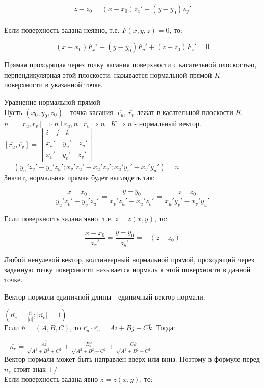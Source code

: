 $$z-z_0 = (x-x_0)z_x' + (y-y_0)z_y'$$
\\
Если поверхность задана неявно, т.е. $F(x,y,z) = 0$, то: 

$$(x-x_0)F_x' + (y-y_0)F_y' + (z-z_0)F_z' = 0$$

\opred

Прямая проходящая через точку касания поверхности с касательной плоскостью, перпендикулярная этой плоскости, называется нормальной прямой $K$ поверхности в указанной точке.

Уравнение нормальной прямой 
\\
Пусть $(x_0,y_0,z_0)$ - точка касания. $\overline{r_u}$,  $\overline{r_v}$ лежат в касательной плоскости $K$.
\\
$\overline {n} = [\overline{r_u},  \overline{r_v}] \Rightarrow \overline {n} \bot \overline{r_u}, \overline {n} \bot \overline{r_v} \Rightarrow \overline {n} \bot  K  \Rightarrow \overline {n}$ - нормальный вектор.
\\
$[\overline{r_u},  \overline{r_v}] =$
$\left| 
  \begin{array}{ccc}
i \quad j \quad k
\\
x_u' \quad y_u' \quad z_u'
\\
x_v' \quad y_v' \quad z_v'
  \end{array}
\right|$
$=(y_u'z_v' - y_v'z_u'; x_v'z_u' - x_u'z_v'; x_u'y_v' - x_v'y_u') = \overline{n} $.
\\
Значит, нормальная прямая будет выглядеть так:

$$\frac {x-x_0}{y_u'z_v' - y_v'z_u'} = \frac {y-y_0}{x_v'z_u' - x_u'z_v'} =  \frac {z-z_0}{x_u'y_v' - x_v'y_u'}$$

Если поверхность задана явно, т.е. $z = z(x,y)$, то:

$$\frac {x-x_0}{z_x'} = \frac {y-y_0}{z_y'} = -(z - z_0)$$

\opred

Любой ненулевой вектор, коллинеарный нормальной прямой, проходящий через заданную точку поверхности называется нормаль к этой поверхности в данной точке.

\opred

Вектор нормали единичной длины - единичный вектор нормали.

$(\overline{n_e} = \frac {\overline{n}}{|\overline{n}|}; |\overline{n_e}| = 1)$
\\
Если $\overline{n} = (A,B,C)$, то $\overline{r_u} \cdot \overline{r_v} = A\overline{i} + B\overline{j} + C\overline{k}$. Тогда: 

$\pm \overline{n_e} = \frac {A\overline{i}}{\sqrt{A^2 + B^2 + C^2}}+ \frac {B\overline{j}}{\sqrt{A^2 + B^2 + C^2}}+\frac {C\overline{k}}{\sqrt{A^2 + B^2 + C^2}}$
\\
Вектор нормали может быть направлен вверх или вниз. Поэтому в формуле перед $\overline{n_e}$ стоит знак $\pm$/
\\
Если поверхность задана явно $z = z(x,y)$, то:

